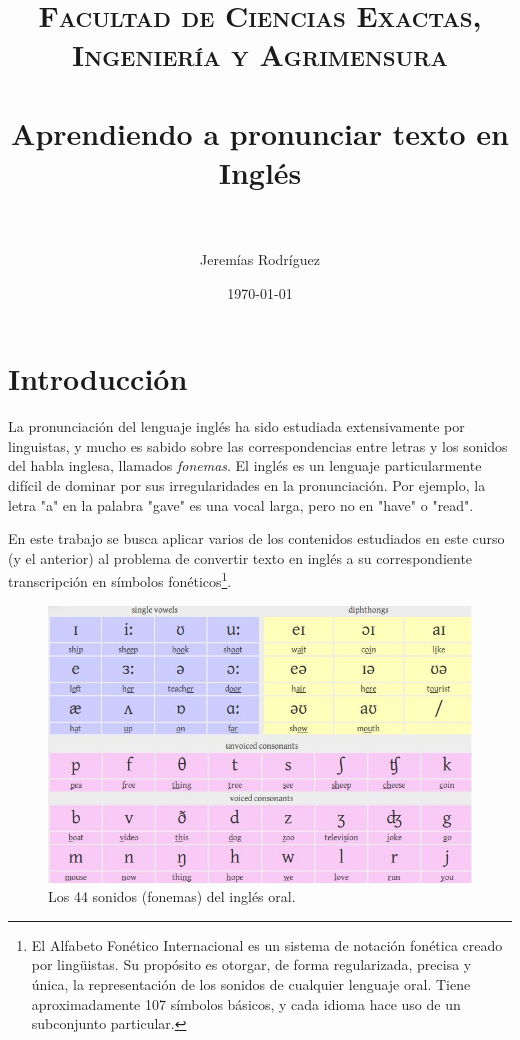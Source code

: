 \documentclass[paper=a4, fontsize=11pt]{scrartcl} %
\title{   
\normalfont \normalsize 
\textsc{Facultad de Ciencias Exactas, Ingeniería y Agrimensura} \\ [25pt] %
\horrule{0.5pt} \\[0.4cm] %
\huge Aprendiendo a pronunciar texto en Inglés \\ %
\horrule{2pt} \\[0.5cm] %
}
\author{Jeremías Rodríguez} %
\date{\normalsize\today} %
\numberwithin{equation}{section} %
\numberwithin{figure}{section} %
\numberwithin{table}{section} %
\begin{document}
\maketitle %


\section{Introducción}

\par La pronunciación del lenguaje inglés ha sido estudiada extensivamente por linguistas, y mucho es sabido sobre las correspondencias entre letras y los sonidos del habla inglesa, llamados \emph{fonemas}.  El inglés es un lenguaje particularmente difícil de dominar por sus irregularidades en la pronunciación. Por ejemplo, la letra "a" en la palabra "gave" es una vocal larga,  pero no en "have" o "read".\\
\par En este trabajo se busca aplicar varios de los contenidos estudiados en este curso (y el anterior) al problema de convertir texto en inglés a su correspondiente transcripción en símbolos fonéticos\footnote{El Alfabeto Fonético Internacional es un sistema de notación fonética creado por lingüistas. Su propósito es otorgar, de forma regularizada, precisa y única, la representación de los sonidos de cualquier lenguaje oral. Tiene aproximadamente 107 símbolos básicos, y cada idioma hace uso de un subconjunto particular.}. \\

\begin{figure}[h!]
\centering
\includegraphics[width=120mm]{phonemicChart.jpg}
\caption{Los 44 sonidos (fonemas) del inglés oral.}
\label{fig:method}
\end{figure}
\end{document}
